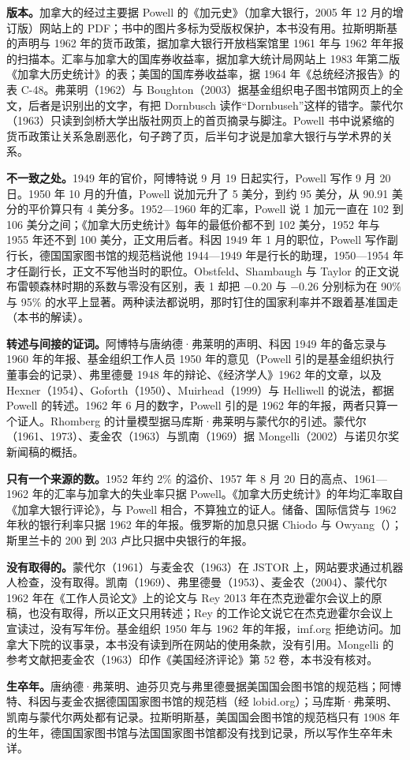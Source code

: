 \begin{deeper}[史料说明]
\textbf{版本。}加拿大的经过主要据 Powell 的《加元史》（加拿大银行，2005 年 12 月的增订版）网站上的 PDF；书中的图片多标为受版权保护，本书没有用。拉斯明斯基的声明与 1962 年的货币政策，据加拿大银行开放档案馆里 1961 年与 1962 年年报的扫描本。汇率与加拿大的国库券收益率，据加拿大统计局网站上 1983 年第二版《加拿大历史统计》的表；美国的国库券收益率，据 1964 年《总统经济报告》的表 C-48。弗莱明（1962）与 Boughton（2003）据基金组织电子图书馆网页上的全文，后者是识别出的文字，有把 Dornbusch 读作“Dornbuseh”这样的错字。蒙代尔（1963）只读到剑桥大学出版社网页上的首页摘录与脚注。Powell 书中说紧缩的货币政策让关系急剧恶化，句子跨了页，后半句才说是加拿大银行与学术界的关系。

\textbf{不一致之处。}1949 年的官价，阿博特说 9 月 19 日起实行，Powell 写作 9 月 20 日。1950 年 10 月的升值，Powell 说加元升了 5 美分，到约 95 美分，从 90.91 美分的平价算只有 4 美分多。1952—1960 年的汇率，Powell 说 1 加元一直在 102 到 106 美分之间；《加拿大历史统计》每年的最低价都不到 102 美分，1952 年与 1955 年还不到 100 美分，正文用后者。科因 1949 年 1 月的职位，Powell 写作副行长，德国国家图书馆的规范档说他 1944—1949 年是行长的助理，1950—1954 年才任副行长，正文不写他当时的职位。Obstfeld、Shambaugh 与 Taylor 的正文说布雷顿森林时期的系数与零没有区别，表 1 却把 $-0.20$ 与 $-0.26$ 分别标为在 90\% 与 95\% 的水平上显著。两种读法都说明，那时钉住的国家利率并不跟着基准国走（本书的解读）。

\textbf{转述与间接的证词。}阿博特与唐纳德·弗莱明的声明、科因 1949 年的备忘录与 1960 年的年报、基金组织工作人员 1950 年的意见（Powell 引的是基金组织执行董事会的记录）、弗里德曼 1948 年的辩论、《经济学人》1962 年的文章，以及 Hexner（1954）、Goforth（1950）、Muirhead（1999）与 Helliwell 的说法，都据 Powell 的转述。1962 年 6 月的数字，Powell 引的是 1962 年的年报，两者只算一个证人。Rhomberg 的计量模型据马库斯·弗莱明与蒙代尔的引述。蒙代尔（1961、1973）、麦金农（1963）与凯南（1969）据 Mongelli（2002）与诺贝尔奖新闻稿的概括。

\textbf{只有一个来源的数。}1952 年约 2\% 的溢价、1957 年 8 月 20 日的高点、1961—1962 年的汇率与加拿大的失业率只据 Powell。《加拿大历史统计》的年均汇率取自《加拿大银行评论》，与 Powell 相合，不算独立的证人。储备、国际信贷与 1962 年秋的银行利率只据 1962 年的年报。俄罗斯的加息只据 Chiodo 与 Owyang（）；斯里兰卡的 200 到 203 卢比只据中央银行的年报。

\textbf{没有取得的。}蒙代尔（1961）与麦金农（1963）在 JSTOR 上，网站要求通过机器人检查，没有取得。凯南（1969）、弗里德曼（1953）、麦金农（2004）、蒙代尔 1962 年在《工作人员论文》上的论文与 Rey 2013 年在杰克逊霍尔会议上的原稿，也没有取得，所以正文只用转述；Rey 的工作论文说它在杰克逊霍尔会议上宣读过，没有写年份。基金组织 1950 年与 1962 年的年报，imf.org 拒绝访问。加拿大下院的议事录，本书没有读到所在网站的使用条款，没有引用。Mongelli 的参考文献把麦金农（1963）印作《美国经济评论》第 52 卷，本书没有核对。

\textbf{生卒年。}唐纳德·弗莱明、迪芬贝克与弗里德曼据美国国会图书馆的规范档；阿博特、科因与麦金农据德国国家图书馆的规范档（经 lobid.org）；马库斯·弗莱明、凯南与蒙代尔两处都有记录。拉斯明斯基，美国国会图书馆的规范档只有 1908 年的生年，德国国家图书馆与法国国家图书馆都没有找到记录，所以写作生卒年未详。
\end{deeper}
